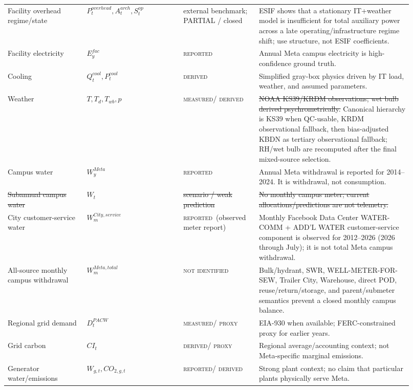 \documentclass[11pt]{article}
\newcommand{\oldtxt}[1]{\textcolor{blue!70!black}{\sout{#1}}}
\newcommand{\latesttxt}[1]{\textcolor{purple!85!black}{#1}}
\newcommand{\Reported}{\textsc{reported}}
\newcommand{\Measured}{\textsc{measured}}
\newcommand{\Derived}{\textsc{derived}}
\newcommand{\Proxy}{\textsc{proxy}}
\newcommand{\NotIdentified}{\textsc{not identified}}
\begin{document}
\begin{longtable}{@{}p{0.18\linewidth}p{0.22\linewidth}p{0.17\linewidth}p{0.35\linewidth}@{}}
\latesttxt{Facility overhead regime/state} & \latesttxt{\(P^{overhead}_t,A^{arch}_t,S^{op}_t\)} & \latesttxt{external benchmark; PARTIAL / closed} & \latesttxt{ESIF shows that a stationary IT+weather model is insufficient for total auxiliary power across a late operating/infrastructure regime shift; use structure, not ESIF coefficients.} \\
Facility electricity & \(E^{fac}_y\) & \Reported & Annual Meta campus electricity is high-confidence ground truth. \\
Cooling & \(Q^{cool}_t,P^{cool}_t\) & \Derived & Simplified gray-box physics driven by IT load, weather, and assumed parameters. \\
Weather & \(T,T_d,T_{wb},p\) & \Measured / \Derived & \oldtxt{NOAA KS39/KRDM observations; wet bulb derived psychrometrically.} \latesttxt{Canonical hierarchy is KS39 when QC-usable, KRDM observational fallback, then bias-adjusted KBDN as tertiary observational fallback; RH/wet bulb are recomputed after the final mixed-source selection.} \\
Campus water & \(W^{Meta}_y\) & \Reported & Annual Meta withdrawal is reported for 2014--2024. It is withdrawal, not consumption. \\
\oldtxt{Subannual campus water} & \oldtxt{\(W_t\)} & \oldtxt{scenario / weak prediction} & \oldtxt{No monthly campus meter; current allocations/predictions are not telemetry.} \\
\latesttxt{City customer-service water} & \latesttxt{\(W^{City,service}_m\)} & \latesttxt{\Reported\ (observed meter report)} & \latesttxt{Monthly Facebook Data Center WATER-COMM + ADD'L WATER customer-service component is observed for 2012--2026 (2026 through July); it is not total Meta campus withdrawal.} \\
\latesttxt{All-source monthly campus withdrawal} & \latesttxt{\(W^{Meta,total}_m\)} & \latesttxt{\NotIdentified} & \latesttxt{Bulk/hydrant, SWR, WELL-METER-FOR-SEW, Trailer City, Warehouse, direct POD, reuse/return/storage, and parent/submeter semantics prevent a closed monthly campus balance.} \\
Regional grid demand & \(D^{PACW}_t\) & \Measured / \Proxy & EIA-930 when available; FERC-constrained proxy for earlier years. \\
Grid carbon & \(CI_t\) & \Derived / \Proxy & Regional average/accounting context; not Meta-specific marginal emissions. \\
Generator water/emissions & \(W_{g,t},CO_{2,g,t}\) & \Reported / \Derived & Strong plant context; no claim that particular plants physically serve Meta. \\

\end{longtable}
\end{document}
